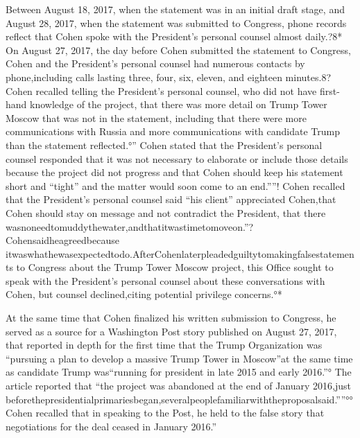 Between August 18, 2017, when the statement was in an initial draft stage, and August 28, 2017, when the statement was submitted to Congress, phone records reflect that Cohen spoke with the President's personal counsel almost daily.?8* On August 27, 2017, the day before Cohen submitted the statement to Congress, Cohen and the President's personal counsel had numerous contacts by phone,including calls lasting three, four, six, eleven, and eighteen minutes.8? Cohen recalled telling the President's personal counsel, who did not have first-hand knowledge of the project, that there was more detail on Trump Tower Moscow that was not in the statement, including that there were more communications with Russia and more communications with candidate Trump than the statement reflected.°” Cohen stated that the President's personal counsel responded that it was not necessary to elaborate or include those details because the project did not progress and that Cohen should keep his statement short and “tight” and the matter would soon come to an end.””! Cohen recalled that the President's personal counsel said “his client” appreciated Cohen,that Cohen should stay on message and not contradict the President, that there wasnoneedtomuddythewater,andthatitwastimetomoveon.”? Cohensaidheagreedbecause itwaswhathewasexpectedtodo.AfterCohenlaterpleadedguiltytomakingfalsestatements to Congress about the Trump Tower Moscow project, this Office sought to speak with the President's personal counsel about these conversations with Cohen, but counsel declined,citing potential privilege concerns.°*

At the same time that Cohen finalized his written submission to Congress, he served as a source for a Washington Post story published on August 27, 2017, that reported in depth for the first time that the Trump Organization was “pursuing a plan to develop a massive Trump Tower in Moscow”at the same time as candidate Trump was“running for president in late 2015 and early 2016.”° The article reported that “the project was abandoned at the end of January 2016,just beforethepresidentialprimariesbegan,severalpeoplefamiliarwiththeproposalsaid.””°° Cohen recalled that in speaking to the Post, he held to the false story that negotiations for the deal ceased in January 2016.”

